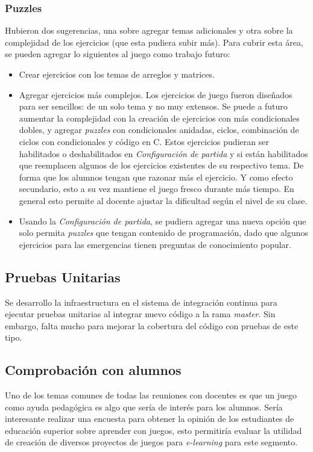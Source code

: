 \subsubsection{Puzzles}
Hubieron dos sugerencias, una sobre agregar temas adicionales y otra sobre la complejidad de los ejercicios (que esta pudiera subir más). Para cubrir esta área, se pueden agregar lo siguientes al juego como trabajo futuro:
\begin{itemize}
    \item Crear ejercicios con los temas de arreglos y matrices.
    \item Agregar ejercicios más complejos. Los ejercicios de juego fueron diseñados para ser sencillos: de un solo tema y no muy extensos. Se puede a futuro aumentar la complejidad con la creación de ejercicios con más condicionales dobles, y agregar \textit{puzzles} con condicionales anidadas, ciclos, combinación de ciclos con condicionales y código en C. Estos ejercicios pudieran ser habilitados o deshabilitados en \textit{Configuración de partida} y si están habilitados que reemplacen algunos de los ejercicios existentes de su respectivo tema. De forma que los alumnos tengan que razonar más el ejercicio. Y como efecto secundario, esto a su vez mantiene el juego fresco durante más tiempo. En general esto permite al docente ajustar la dificultad según el nivel de su clase.
    \item Usando la \textit{Configuración de partida}, se pudiera agregar una nueva opción que solo permita \textit{puzzles} que tengan contenido de programación, dado que algunos ejercicios para las emergencias tienen preguntas de conocimiento popular.
\end{itemize}

\subsection{Pruebas Unitarias}
Se desarrollo la infraestructura en el sistema de integración continua para ejecutar pruebas unitarias al integrar nuevo código a la rama \textit{master}. Sin embargo, falta mucho para mejorar la cobertura del código con pruebas de este tipo. 

\subsection{Comprobación con alumnos}
Uno de los temas comunes de todas las reuniones con docentes es que un juego como ayuda pedagógica es algo que sería de interés para los alumnos. Sería interesante realizar una encuesta para obtener la opinión de los estudiantes de educación superior sobre aprender con juegos, esto permitiría evaluar la utilidad de creación de diversos proyectos de juegos para \textit{e-learning} para este segmento. 

